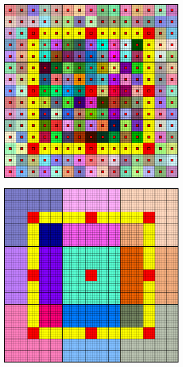 \begin{figure}[htbp]
  \begin{subfigure}[t]{0.3\textwidth}
    \centerline{\includegraphics[width=0.9\linewidth]{figs/square/square_cart_struct_cell_ml_lvl1_grid.png}}
  \end{subfigure}
  \hfill
  \begin{subfigure}[t]{0.3\textwidth}
    \centerline{\includegraphics[width=0.9\linewidth]{figs/square/square_cart_struct_cell_ml_lvl2_grid.png}}

\end{subfigure}
\end{figure}
